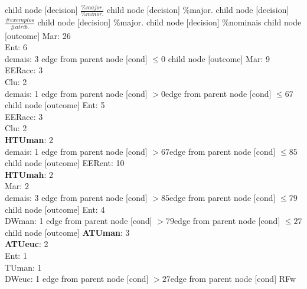 child {node [decision] {$\frac{\%major.}{\%minor.}$}
child {node [decision] {\%major.}
child {node [decision] {$\frac{\#exemplos}{\#atrib.}$}
child {node [decision] {\%major.}
child {node [decision] {\%nominais}
child {node [outcome] {Mar: 26\\
Ent: 6\\
demais: 3} edge from parent node [cond] {$\leq0$}}
child {node [outcome] {Mar: 9\\
EERacc: 3\\
Clu: 2\\
demais: 1} edge from parent node [cond] {$>0$}}edge from parent node [cond] {$\leq67$}}
child {node [outcome] {Ent: 5\\
EERacc: 3\\
Clu: 2\\
\textbf{HTUman}: 2\\
demais: 1} edge from parent node [cond] {$>67$}}edge from parent node [cond] {$\leq85$}}
child {node [outcome] {EERent: 10\\
\textbf{HTUmah}: 2\\
Mar: 2\\
demais: 3} edge from parent node [cond] {$>85$}}edge from parent node [cond] {$\leq79$}}
child {node [outcome] {Ent: 4\\
DWman: 1} edge from parent node [cond] {$>79$}}edge from parent node [cond] {$\leq27$}}
child {node [outcome] {\textbf{ATUman}: 3\\
\textbf{ATUeuc}: 2\\
Ent: 1\\
TUman: 1\\
DWeuc: 1} edge from parent node [cond] {$>27$}}edge from parent node [cond] {RFw}}
